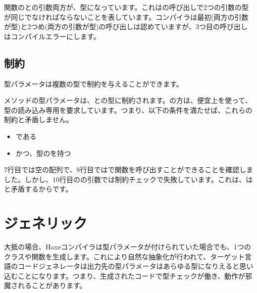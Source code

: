 
関数のとの引数両方が、型になっています。これはの呼び出しで2つの引数の型が同じでなければならないことを表しています。コンパイラは最初(両方の引数が型)と2つめ(両方の引数が型)の呼び出しは認めていますが、3つ目の呼び出しはコンパイルエラーにします。



\subsection{制約}
\label{type-system-type-parameter-constraints}

型パラメータは複数の型で制約を与えることができます。


メソッドの型パラメータは、との型に制約されます。の方は、便宜上を使って、型の読み込み専用を要求しています。つまり、以下の条件を満たせば、これらの制約と矛盾しません。

\begin{itemize}
	\item {}である
	\item かつ、型のを持つ
\end{itemize}

7行目では空の配列で、8行目ではで関数を呼び出すことができることを確認しました。しかし、10行目のの引数では制約チェックで失敗しています。これは、はと矛盾するからです。

\section{ジェネリック}
\label{type-system-generic}

大抵の場合、Haxeコンパイラは型パラメータが付けられていた場合でも、1つのクラスや関数を生成します。これにより自然な抽象化が行われて、ターゲット言語のコードジェネレータは出力先の型パラメータはあらゆる型になりえると思い込むことになります。つまり、生成されたコードで型チェックが働き、動作が邪魔されることがあります。

